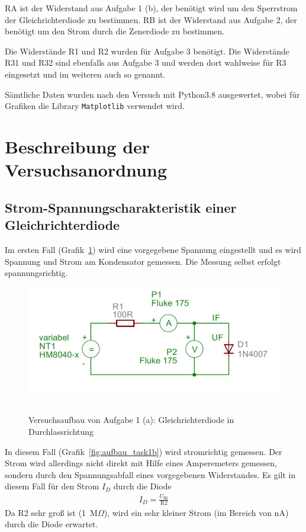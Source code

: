 \documentclass{article}
\begin{document}
RA ist der Widerstand aus Aufgabe 1 (b), der benötigt wird um den Sperrstrom der Gleichrichterdiode  zu bestimmen.
RB ist der Widerstand aus Aufgabe 2, der benötigt um den Strom durch die Zenerdiode zu bestimmen.


Die Widerstände R1 und R2 wurden für Aufgabe 3 benötigt. Die Widerstände R31 und R32 sind ebenfalls aus Aufgabe 3 und werden dort wahlweise für R3 eingesetzt und im weiteren auch so genannt.


Sämtliche Daten wurden nach den Versuch mit Python3.8 ausgewertet, wobei für Grafiken die Library \texttt{Matplotlib} verwendet wird. 





\section{Beschreibung der Versuchsanordnung}

\subsection{Strom-Spannungscharakteristik einer Gleichrichterdiode}

Im ersten Fall (Grafik~\ref{fig:aufbau_task1a}) wird eine vorgegebene Spannung eingestellt und es wird Spannung und Strom am Kondensator gemessen. Die Messung selbst erfolgt spannungsrichtig.

\begin{figure}[H]
\caption{Versuchsaufbau von Aufgabe 1 (a): Gleichrichterdiode in Durchlassrichtung}
\label{fig:aufbau_task1a}
{\centering
\includegraphics[scale=1.7]{bilder/aufbau_task1a.png}
~
}
\end{figure}


In diesem Fall (Grafik~\ref{fig:aufbau_task1b}) wird stromrichtig gemessen. Der Strom wird allerdings nicht direkt mit Hilfe eines Amperemeters gemessen, sondern durch den Spannungsabfall eines vorgegebenen Widerstandes. Es gilt in diesem Fall für den Strom $I_D$ durch die Diode
\begin{align*}
I_D = \frac{U_\text{IR}}{\text{R2}}
\end{align*}
Da R2 sehr groß ist (1~M$\Omega$), wird ein sehr kleiner Strom (im Bereich von nA) durch die Diode erwartet.
\end{document}
